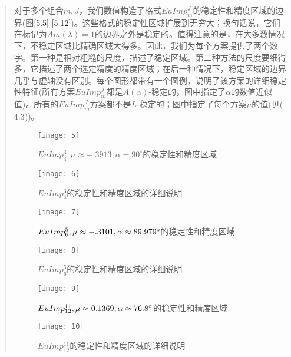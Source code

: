 \documentclass{article}
\begin{document}
\begin{CJK}{UTF8}{gkai}
\begin{quotation}
对于多个组合$m,J$，我们数值构造了格式$EuImp^{J}_{m}$的稳定性和精度区域的边界(图\ref{5.5}-\ref{5.12})。这些格式的稳定性区域扩展到无穷大；换句话说，它们在标记为$Am(\lambda)=1$的边界之外是稳定的。值得注意的是，在大多数情况下，不稳定区域比精确区域大得多。因此，我们为每个方案提供了两个数字。第一种是相对粗糙的尺度，描述了稳定区域。第二种方法的尺度要细得多，它描述了两个选定精度的精度区域；在后一种情况下，稳定区域的边界几乎与虚轴没有区别。每个图形都带有一个图例，说明了该方案的详细稳定性特征(所有方案$EuImp^{J}_{m}$都是$A(\alpha)$-稳定的，图中指定了$\alpha$的数值近似值)。所有的$EuImp^{J}_{m}$方案都不是$L$-稳定的；图中指定了每个方案$\mu$的值(见($4.3$))。\\
\begin{figure}[htbp]
{
		\begin{minipage}{6cm}
			\centering
			\texttt{[image: 5]}
			\caption{$EuImp_{4}^{3},\mu \approx -.3913,\alpha = 90^{\circ}$的稳定性和精度区域}
			\label{5.5}
		\end{minipage}
	}
{
		\begin{minipage}{6cm}
			\centering
			\texttt{[image: 6]}
			\caption{$EuImp_{4}^{3}$的稳定性和精度区域的详细说明}
			\label{5.6}
		\end{minipage}
	}
\end{figure}
\begin{figure}[htbp]
{
		\begin{minipage}{6cm}
			\centering
			\texttt{[image: 7]}
			\caption{$EuImp_{6}^{5},\mu \approx -.3101,\\ \alpha \approx 89.979^{\circ}$的稳定性和精度区域}
			\label{5.7}
		\end{minipage}
	}
	{
		\begin{minipage}{6cm}
			\centering
			\texttt{[image: 8]}
			\caption{$EuImp_{6}^{5}$的稳定性和精度区域的详细说明}
			\label{5.8}
		\end{minipage}
	}
\end{figure}
\begin{figure}[htbp]
{
		\begin{minipage}{6cm}
			\centering
			\texttt{[image: 9]}
			\caption{$EuImp_{12}^{11},\mu \approx 0.1369,\\ \alpha \approx 76.8^{\circ}$的稳定性和精度区域}
			\label{5.9}
		\end{minipage}
	}
	{
		\begin{minipage}{6cm}
			\centering
			\texttt{[image: 10]}
			\caption{$EuImp_{12}^{11}$的稳定性和精度区域的详细说明}

\end{minipage}}
\end{figure}
\end{quotation}
\end{CJK}
\end{document}
